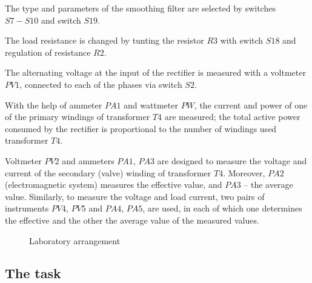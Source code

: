 \documentclass[a4paper,14pt]{article}
\begin{document}
The type and parameters of the smoothing filter are selected by switches $S7-S10$ and switch $S19$.

The load resistance is changed by tunting the resistor $R3$ with switch $S18$ and regulation of resistance $R2$.

The alternating voltage at the input of the rectifier is measured with a voltmeter $PV1$, connected to each 
of the phases via switch $S2$.

With the help of ammeter $PA1$ and wattmeter $PW$, the current and power of one of the primary windings of 
transformer $T4$ are measured; the total active power consumed by the rectifier is proportional to 
the number of windings used transformer $T4$.

Voltmeter $PV2$ and ammeters $PA1$, $PA3$ are designed to measure the voltage and current of the secondary (valve) 
winding of transformer $T4$. Moreover, $PA2$ (electromagnetic system) measures the effective value, and $PA3$ 
-- the average value.
Similarly, to measure the voltage and load current, two pairs of instruments $PV4$, $PV5$ and $PA4$, $PA5$, 
are used, in each of which one determines the effective and the other the average value of the measured values.

\begin{landscape}
        \hspace{-3cm}
        \vspace{1cm}
\begin{figure}[ht!]

\caption{Laboratory arrangement}
\label{labsetup2}
\end{figure}
\end{landscape}

\subsection{The task}
\end{document}
